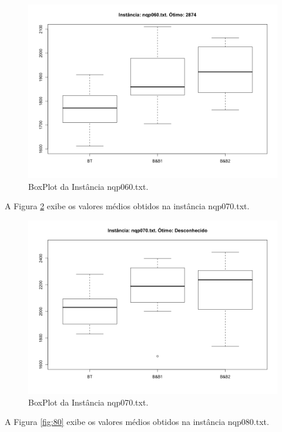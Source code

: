 \documentclass[12pt]{article}
\begin{document}
	\begin{figure}[H]
		\centering
		\includegraphics[width=0.9\linewidth]{img/60}
		\caption{BoxPlot da Instância nqp060.txt.}
		\label{fig:60}
	\end{figure}

	A Figura \ref{fig:70} exibe os valores médios obtidos na instância nqp070.txt.

	\begin{figure}[H]
		\centering
		\includegraphics[width=0.9\linewidth]{img/70}
		\caption{BoxPlot da Instância nqp070.txt.}
		\label{fig:70}
	\end{figure}

	A Figura \ref{fig:80} exibe os valores médios obtidos na instância nqp080.txt.
\end{document}
